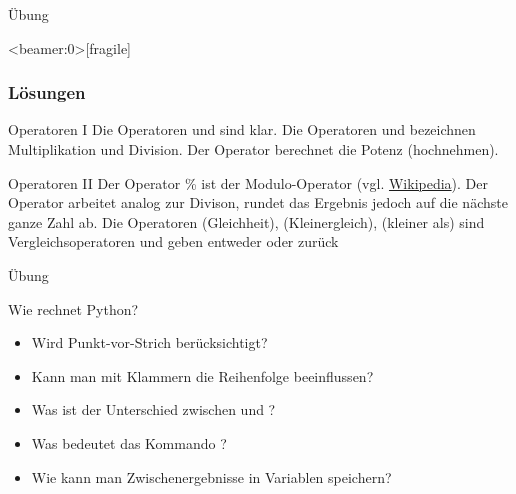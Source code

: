 \begin{frame}{Übung}
\end{frame}

\begin{frame}<beamer:0>[fragile]
\frametitle{Lösungen}
\begin{solutionblock}{Operatoren I}
Die Operatoren 	\pybw{+} und \pybw{-} sind klar. Die Operatoren \pybw{*} und \pybw{/} bezeichnen Multiplikation und Division. 
Der Operator \pybw{**} berechnet die Potenz (hochnehmen). 
\end{solutionblock}

\vspace{12pt}

\begin{solutionblock}{Operatoren II}
	Der Operator \% ist der Modulo-Operator (vgl.  \href{https://de.wikipedia.org/wiki/Division_mit_Rest#Modulo}{Wikipedia}). Der Operator \pybw{//} arbeitet analog zur Divison, rundet das Ergebnis jedoch auf die nächste ganze Zahl ab. Die Operatoren \pybw{==} (Gleichheit), \pybw{<=} (Kleinergleich), \pybw{<} (kleiner als) sind Vergleichsoperatoren und geben entweder  oder  zurück
\end{solutionblock}


\end{frame}




\begin{frame}{Übung}
	\begin{block}{Wie rechnet Python?}
		\begin{itemize}
			\item Wird Punkt-vor-Strich berücksichtigt?
			\item Kann man mit Klammern die Reihenfolge beeinflussen?
			\item Was ist der Unterschied zwischen  und  ?
			\item Was bedeutet das Kommando \py{_}? 
			\item Wie kann man Zwischenergebnisse in Variablen speichern?
		\end{itemize}
	\end{block}
\end{frame}

